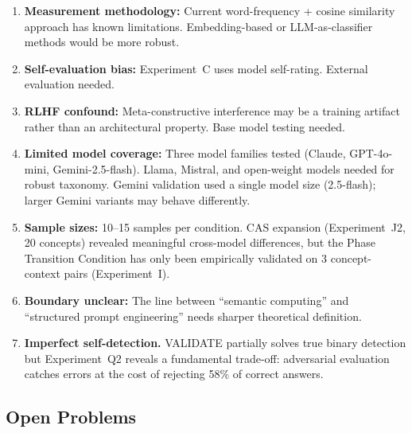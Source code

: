 \documentclass[11pt,a4paper]{article}
\begin{document}
\begin{enumerate}
\item \textbf{Measurement methodology:} Current word-frequency + cosine similarity approach has known limitations. Embedding-based or LLM-as-classifier methods would be more robust.

\item \textbf{Self-evaluation bias:} Experiment~C uses model self-rating. External evaluation needed.

\item \textbf{RLHF confound:} Meta-constructive interference may be a training artifact rather than an architectural property. Base model testing needed.

\item \textbf{Limited model coverage:} Three model families tested (Claude, GPT-4o-mini, Gemini-2.5-flash). Llama, Mistral, and open-weight models needed for robust taxonomy. Gemini validation used a single model size (2.5-flash); larger Gemini variants may behave differently.

\item \textbf{Sample sizes:} 10--15 samples per condition. CAS expansion (Experiment~J2, 20 concepts) revealed meaningful cross-model differences, but the Phase Transition Condition has only been empirically validated on 3 concept-context pairs (Experiment~I).

\item \textbf{Boundary unclear:} The line between ``semantic computing'' and ``structured prompt engineering'' needs sharper theoretical definition.

\item \textbf{Imperfect self-detection.} VALIDATE partially solves true binary detection but Experiment~Q2 reveals a fundamental trade-off: adversarial evaluation catches errors at the cost of rejecting 58\% of correct answers.
\end{enumerate}

\subsection{Open Problems}
\label{sec:open-problems}
\end{document}
